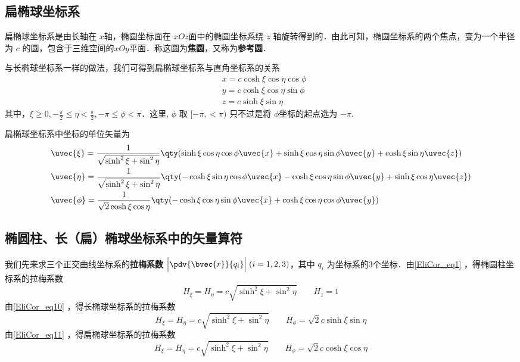 \subsection{扁椭球坐标系}
扁椭球坐标系是由长轴在 $x$轴，椭圆坐标面在 $xOz$面中的椭圆坐标系绕 $z$ 轴旋转得到的．由此可知，椭圆坐标系的两个焦点，变为一个半径为 $c$ 的圆，包含于三维空间的$xOy$平面．称这圆为\textbf{焦圆}，又称为\textbf{参考圆}．

与长椭球坐标系一样的做法，我们可得到扁椭球坐标系与直角坐标系的关系
\begin{equation}\label{EliCor_eq11}
\begin{aligned}
&x=c\cosh\xi\cos\eta\cos\phi\\
&y=c\cosh\xi\cos\eta\sin\phi\\
&z=c\sinh\xi\sin\eta
\end{aligned}
\end{equation}
其中，$\xi\geq 0,-\frac{\pi}{2}\leq\eta<\frac{\pi}{2},-\pi\leq\phi<\pi$．这里, $\phi$ 取 $[-\pi,<\pi)$ 只不过是将 $\phi$坐标的起点选为 $-\pi$.

扁椭球坐标系中坐标的单位矢量为
\begin{equation}
\begin{aligned}
&\uvec{\xi}=\frac{1}{\sqrt{\sinh^2\xi+\sin^2\eta}}\qty(\sinh\xi\cos\eta\cos\phi\uvec{x}+\sinh\xi\cos\eta\sin\phi\uvec{y}+\cosh\xi\sin\eta\uvec{z})\\
&\uvec{\eta}=\frac{1}{\sqrt{\sinh^2\xi+\sin^2\eta}}\qty(-\cosh\xi\sin\eta\cos\phi\uvec{x}-\cosh\xi\cos\eta\sin\phi\uvec{y}+\sinh\xi\cos\eta\uvec{z})\\
&\uvec{\phi}=\frac{1}{\sqrt{2}\cosh\xi\cos\eta}\qty(-\cosh\xi\cos\eta\sin\phi\uvec{x}+\cosh\xi\cos\eta\cos\phi\uvec{y})
\end{aligned}
\end{equation}

\subsection{椭圆柱、长（扁）椭球坐标系中的矢量算符}
我们先来求三个正交曲线坐标系的\textbf{拉梅系数} $\Big|\pdv{\bvec{r}}{q_i}\Big|\;(i=1,2,3)$，其中 $q_i$ 为坐标系的3个坐标．由\autoref{EliCor_eq1} ，得椭圆柱坐标系的拉梅系数
\begin{equation}
H_\xi=H_\eta=c\sqrt{\sinh^2\xi+\sin^2\eta} \quad \quad H_z=1
\end{equation}
由\autoref{EliCor_eq10} ，得长椭球坐标系的拉梅系数
\begin{equation}
H_\xi=H_\eta=c\sqrt{\sinh^2\xi+\sin^2\eta} \quad \quad H_\phi=\sqrt{2}c\sinh\xi\sin\eta
\end{equation}
由\autoref{EliCor_eq11} ，得扁椭球坐标系的拉梅系数
\begin{equation}
H_\xi=H_\eta=c\sqrt{\sinh^2\xi+\sin^2\eta} \quad \quad H_\phi=\sqrt{2}c\cosh\xi\cos\eta
\end{equation}

